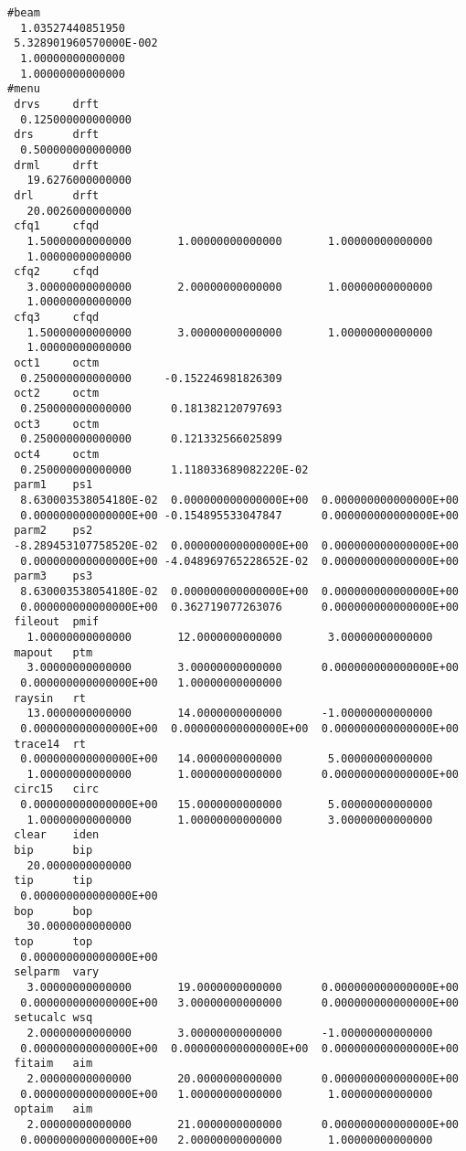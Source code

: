 \begin{footnotesize}
\begin{verbatim}
#beam
  1.03527440851950
 5.328901960570000E-002
  1.00000000000000
  1.00000000000000
#menu
 drvs     drft
  0.125000000000000
 drs      drft
  0.500000000000000
 drml     drft
   19.6276000000000
 drl      drft
   20.0026000000000
 cfq1     cfqd
   1.50000000000000       1.00000000000000       1.00000000000000
   1.00000000000000
 cfq2     cfqd
   3.00000000000000       2.00000000000000       1.00000000000000
   1.00000000000000
 cfq3     cfqd
   1.50000000000000       3.00000000000000       1.00000000000000
   1.00000000000000
 oct1     octm
  0.250000000000000     -0.152246981826309
 oct2     octm
  0.250000000000000      0.181382120797693
 oct3     octm
  0.250000000000000      0.121332566025899
 oct4     octm
  0.250000000000000      1.118033689082220E-02
 parm1    ps1
  8.630003538054180E-02  0.000000000000000E+00  0.000000000000000E+00
  0.000000000000000E+00 -0.154895533047847      0.000000000000000E+00
 parm2    ps2
 -8.289453107758520E-02  0.000000000000000E+00  0.000000000000000E+00
  0.000000000000000E+00 -4.048969765228652E-02  0.000000000000000E+00
 parm3    ps3
  8.630003538054180E-02  0.000000000000000E+00  0.000000000000000E+00
  0.000000000000000E+00  0.362719077263076      0.000000000000000E+00
 fileout  pmif
   1.00000000000000       12.0000000000000       3.00000000000000
 mapout   ptm
   3.00000000000000       3.00000000000000      0.000000000000000E+00
  0.000000000000000E+00   1.00000000000000
 raysin   rt
   13.0000000000000       14.0000000000000      -1.00000000000000
  0.000000000000000E+00  0.000000000000000E+00  0.000000000000000E+00
 trace14  rt
  0.000000000000000E+00   14.0000000000000       5.00000000000000
   1.00000000000000       1.00000000000000      0.000000000000000E+00
 circ15   circ
  0.000000000000000E+00   15.0000000000000       5.00000000000000
   1.00000000000000       1.00000000000000       3.00000000000000
 clear    iden
 bip      bip
   20.0000000000000
 tip      tip
  0.000000000000000E+00
 bop      bop
   30.0000000000000
 top      top
  0.000000000000000E+00
 selparm  vary
   3.00000000000000       19.0000000000000      0.000000000000000E+00
  0.000000000000000E+00   3.00000000000000      0.000000000000000E+00
 setucalc wsq
   2.00000000000000       3.00000000000000      -1.00000000000000
  0.000000000000000E+00  0.000000000000000E+00  0.000000000000000E+00
 fitaim   aim
   2.00000000000000       20.0000000000000      0.000000000000000E+00
  0.000000000000000E+00   1.00000000000000       1.00000000000000
 optaim   aim
   2.00000000000000       21.0000000000000      0.000000000000000E+00
  0.000000000000000E+00   2.00000000000000       1.00000000000000

\end{verbatim}
\end{footnotesize}
